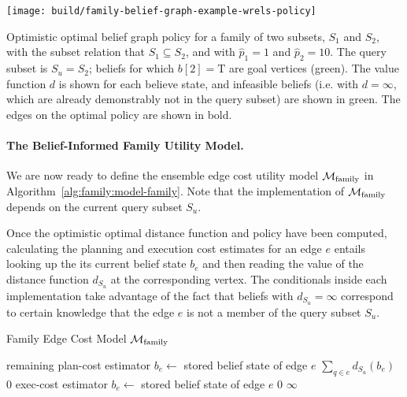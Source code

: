 \begin{marginfigure}
   \centering
   \texttt{[image: build/family-belief-graph-example-wrels-policy]}
   \caption{Optimistic optimal belief graph policy
      for a family of two subsets, $S_1$ and $S_2$,
      with the subset relation that $S_1 \subseteq S_2$,
      and with $\hat{p}_1 = 1$ and $\hat{p}_2 = 10$.
      The query subset is $S_u = S_2$;
      beliefs for which $b[2] = \mbox{T}$ are goal vertices (green).
      The value function $d$ is shown for each believe state,
      and infeasible beliefs
      (i.e. with $d = \infty$,
      which are already demonstrably not in the query subset)
      are shown in green.
      The edges on the optimal policy are shown in bold.}
   \label{fig:family:belief-graph-example-wrels-policy}
\end{marginfigure}

\paragraph{The Belief-Informed Family Utility Model.}
We are now ready to define the ensemble edge cost utility model
$\mathcal{M}_{\mbox{\scriptsize family}}$
in Algorithm~\ref{alg:family:model-family}.
Note that the implementation of $\mathcal{M}_{\mbox{\scriptsize family}}$
depends on the current query subset $S_u$.

Once the optimistic optimal distance function and policy have been
computed,
calculating the planning and execution cost estimates for an edge $e$
entails looking up the its current belief state $b_e$
and then reading the value of the distance function $d_{S_u}$
at the corresponding vertex.
The conditionals inside each implementation take advantage of the
fact that beliefs with $d_{S_u} = \infty$ correspond to certain
knowledge that the edge $e$ is not a member of the query subset $S_u$.

\begin{algorithm}[t]
\caption{Family Edge Cost Model $\mathcal{M}_{\mbox{\scriptsize family}}$}
\label{alg:family:model-family}
\begin{algorithmic}[1]
   \Comment remaining plan-cost estimator
   \State $b_e \leftarrow$ stored belief state of edge $e$
      \State \Return $\sum_{q \in e} d_{S_u}(b_e)$
   \Else
      \State \Return $0$
   \EndIf
\EndFunction
{}
   \Comment exec-cost estimator
   \State $b_e \leftarrow$ stored belief state of edge $e$
      \State \Return $0$
   \Else
      \State \Return $\infty$
   \EndIf
\EndFunction
\end{algorithmic}
\end{algorithm}

